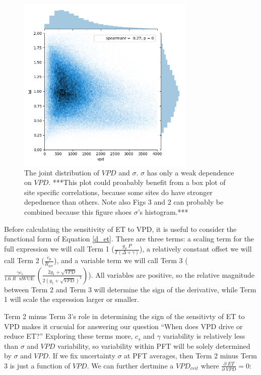 \documentclass[draft,linenumbers]{agujournal}
\begin{document}
\begin{figure}[h]
\centering
\includegraphics[width=20pc]{./fig03.png}
\caption{The joint distribution of $VPD$ and $\sigma$. $\sigma$ has only a weak dependence on $VPD$. ***This plot could proabably benefit from a box plot of site specific correlations, because some sites do have stronger depednence than others. Note also Figs 3 and 2 can probably be combined because this figure shoes $\sigma$'s histogram.***}
\label{lai_vpd_fig}
\end{figure}

Before calculating the sensitivity of ET to VPD, it is useful to consider the functional form of Equation \ref{d_et}. There are three terms: a scaling term for the full expression we will call Term 1 ($\frac{g_a \; P}{T(\Delta + \gamma)}$), a relatively constant offset we will call Term 2 ($\frac{c_p}{R_{air}}$), and a variable term we will call Term 3 ($\frac{\gamma c_s }{1.6 \; R\; \text{ uWUE }} \left( \frac{2 g_1 + \sqrt{VPD}}{2 (g_1 + \sqrt{VPD})^2}\right)$). All variables are positive, so the relative magnitude between Term 2 and Term 3 will determine the sign of the derivative, while Term 1 will scale the expression larger or smaller.


Term 2 minus Term 3's role in determining the sign of the sensitivty of ET to VPD makes it crucuial for answering our question ``When does VPD drive or reduce ET?'' Exploring these terms more, $c_s$ and $\gamma$ variability is relatively less than $\sigma$ and $VPD$ variability, so variability within PFT will be solely determined by $\sigma$ and $VPD$. If we fix uncertainty $\sigma$ at PFT averages, then Term 2 minus Term 3 is just a function of $VPD$. We can further dertmine a $VPD_{crit}$ where $\frac{\partial \; ET}{\partial \; VPD} = 0$:
\end{document}
